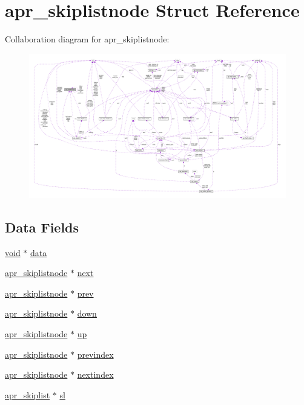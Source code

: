 \hypertarget{structapr__skiplistnode}{}\section{apr\+\_\+skiplistnode Struct Reference}
\label{structapr__skiplistnode}


Collaboration diagram for apr\+\_\+skiplistnode\+:
\nopagebreak
\begin{figure}[H]
\begin{center}
\leavevmode
\includegraphics[width=350pt]{structapr__skiplistnode__coll__graph}
\end{center}
\end{figure}
\subsection*{Data Fields}
\begin{DoxyCompactItemize}
\item 
\hyperlink{group__MOD__ISAPI_gacd6cdbf73df3d9eed42fa493d9b621a6}{void} $\ast$ \hyperlink{structapr__skiplistnode_a91e3af6d4c81c8480a62e0824c723ab1}{data}
\item 
\hyperlink{structapr__skiplistnode}{apr\+\_\+skiplistnode} $\ast$ \hyperlink{structapr__skiplistnode_aaee928c886c07bb7d362b0a376215d34}{next}
\item 
\hyperlink{structapr__skiplistnode}{apr\+\_\+skiplistnode} $\ast$ \hyperlink{structapr__skiplistnode_a6f2cc8064cd9de566c97bd8d96a18cb3}{prev}
\item 
\hyperlink{structapr__skiplistnode}{apr\+\_\+skiplistnode} $\ast$ \hyperlink{structapr__skiplistnode_af827a51bbb433bda9b8010aa5e2e78a2}{down}
\item 
\hyperlink{structapr__skiplistnode}{apr\+\_\+skiplistnode} $\ast$ \hyperlink{structapr__skiplistnode_aed80e851506fb8e07247cfb385caf2ec}{up}
\item 
\hyperlink{structapr__skiplistnode}{apr\+\_\+skiplistnode} $\ast$ \hyperlink{structapr__skiplistnode_a4e35cf089c61b3816cd224ac280105ca}{previndex}
\item 
\hyperlink{structapr__skiplistnode}{apr\+\_\+skiplistnode} $\ast$ \hyperlink{structapr__skiplistnode_a5b4ac546ef7d15796cbe6e9b6ba606f3}{nextindex}
\item 
\hyperlink{structapr__skiplist}{apr\+\_\+skiplist} $\ast$ \hyperlink{structapr__skiplistnode_a6d751900717292094244381e236981bf}{sl}
\end{DoxyCompactItemize}


